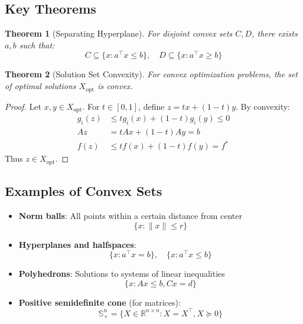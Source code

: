 \documentclass{article}
\theoremstyle{plain}
\newtheorem{theorem}{Theorem}[section]
\begin{document}
\subsection{Key Theorems}
\begin{theorem}[Separating Hyperplane]
For disjoint convex sets \( C,D \), there exists \( a,b \) such that:
\[
C \subseteq \{x : a^\top x \leq b\}, \quad D \subseteq \{x : a^\top x \geq b\}
\]
\end{theorem}

\begin{theorem}[Solution Set Convexity]
For convex optimization problems, the set of optimal solutions \( X_{\text{opt}} \) is convex.
\end{theorem}

\begin{proof}
Let \( x,y \in X_{\text{opt}} \). For \( t \in [0,1] \), define \( z = tx + (1-t)y \). By convexity:
\begin{align*}
g_i(z) &\leq t g_i(x) + (1-t)g_i(y) \leq 0 \\
A z &= t A x + (1-t)A y = b \\
f(z) &\leq t f(x) + (1-t)f(y) = f^*
\end{align*}
Thus \( z \in X_{\text{opt}} \).
\end{proof}


\subsection{Examples of Convex Sets}
\begin{itemize}
    \item \textbf{Norm balls}: All points within a certain distance from center
    \[ \{x : \|x\| \leq r\} \]
    
    \item \textbf{Hyperplanes and halfspaces}:
    \[ \{x : a^\top x = b\}, \quad \{x : a^\top x \leq b\} \]
    
    \item \textbf{Polyhedrons}: Solutions to systems of linear inequalities
    \[ \{x : Ax \leq b, Cx = d\} \]
    
    \item \textbf{Positive semidefinite cone} (for matrices):
    \[ \mathbb{S}_+^n = \{X \in \mathbb{R}^{n\times n} : X = X^\top, X \succeq 0\} \]
\end{itemize}
\end{document}
